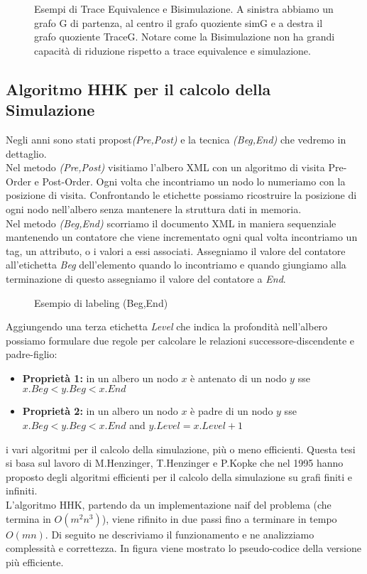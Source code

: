 \documentclass[12pt,a4paper,openright,twoside]{report}
\theoremstyle{definition}
\begin{document}
\begin{figure}[t]
{
}
\caption{Esempi di Trace Equivalence e Bisimulazione. A sinistra abbiamo un grafo G di partenza, al centro il grafo quoziente simG e a destra il grafo quoziente TraceG. Notare come la Bisimulazione non ha grandi capacità di riduzione rispetto a trace equivalence e simulazione.}
\end{figure}
\subsection{Algoritmo HHK per il calcolo della Simulazione}
Negli anni sono stati propost\emph{(Pre,Post)} e la tecnica \emph{(Beg,End)} che vedremo in dettaglio.
\\
Nel metodo \emph{(Pre,Post)} visitiamo l'albero XML con un algoritmo di visita Pre-Order e Post-Order. Ogni volta che incontriamo un nodo lo numeriamo con la posizione di visita. Confrontando le etichette possiamo ricostruire la posizione di ogni nodo nell'albero senza mantenere la struttura dati in memoria.
\\
Nel metodo \emph{(Beg,End)} scorriamo il documento XML in maniera sequenziale mantenendo un contatore che viene incrementato ogni qual volta incontriamo un tag, un attributo, o i valori a essi associati. Assegniamo il valore del contatore all'etichetta \emph{Beg} dell'elemento quando lo incontriamo e quando giungiamo alla terminazione di questo assegniamo il valore del contatore a \emph{End}.
\begin{figure}
\begin{tikzpicture}
\end{tikzpicture}
\caption{Esempio di labeling (Beg,End)}
\end{figure}
Aggiungendo una terza etichetta \emph{Level} che indica la profondità nell'albero possiamo formulare due regole per calcolare le relazioni successore-discendente e padre-figlio:
\begin{itemize}
\item \textbf{Proprietà 1:} in un albero un nodo $x$ è antenato di un nodo $y$ sse $x.Beg < y.Beg < x.End$
\item \textbf{Proprietà 2:} in un albero un nodo $x$ è padre di un nodo $y$ sse $x.Beg < y.Beg < x.End$ and $y.Level = x.Level + 1$
\end{itemize}i vari algoritmi per il calcolo della simulazione, più o meno efficienti. Questa tesi si basa sul lavoro di M.Henzinger, T.Henzinger e P.Kopke che nel 1995 hanno proposto degli algoritmi efficienti per il calcolo della simulazione su grafi finiti e infiniti.\\
L'algoritmo HHK, partendo da un implementazione naif del problema (che termina in $O(m^2n^3)$), viene rifinito in due passi fino a terminare in tempo $O(mn)$. Di seguito ne descriviamo il funzionamento e ne analizziamo complessità e correttezza. In figura viene mostrato lo pseudo-codice della versione più efficiente.
\end{document}
